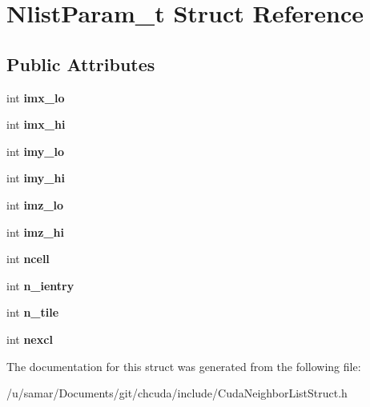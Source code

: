 \hypertarget{structNlistParam__t}{}\section{Nlist\+Param\+\_\+t Struct Reference}
\label{structNlistParam__t}
\subsection*{Public Attributes}
\begin{DoxyCompactItemize}
\item 
\hypertarget{structNlistParam__t_ab78706c9bdb3af53d24fd50f883c1546}{}\label{structNlistParam__t_ab78706c9bdb3af53d24fd50f883c1546} 
int {\bfseries imx\+\_\+lo}
\item 
\hypertarget{structNlistParam__t_a130bf747b9187d966840877eef55b913}{}\label{structNlistParam__t_a130bf747b9187d966840877eef55b913} 
int {\bfseries imx\+\_\+hi}
\item 
\hypertarget{structNlistParam__t_ae36497da13c5d2704f16e0a31fbf0dfd}{}\label{structNlistParam__t_ae36497da13c5d2704f16e0a31fbf0dfd} 
int {\bfseries imy\+\_\+lo}
\item 
\hypertarget{structNlistParam__t_a045160b343cd0a982bdb4e167536f500}{}\label{structNlistParam__t_a045160b343cd0a982bdb4e167536f500} 
int {\bfseries imy\+\_\+hi}
\item 
\hypertarget{structNlistParam__t_a153e766348447e178460a4f6cc36f97d}{}\label{structNlistParam__t_a153e766348447e178460a4f6cc36f97d} 
int {\bfseries imz\+\_\+lo}
\item 
\hypertarget{structNlistParam__t_a111e667909fc5eb69c3b4b9166aba9ed}{}\label{structNlistParam__t_a111e667909fc5eb69c3b4b9166aba9ed} 
int {\bfseries imz\+\_\+hi}
\item 
\hypertarget{structNlistParam__t_a6a6cfb049e7452fcd591c268f038aa49}{}\label{structNlistParam__t_a6a6cfb049e7452fcd591c268f038aa49} 
int {\bfseries ncell}
\item 
\hypertarget{structNlistParam__t_a38820ee7ed32e7238e6672f53f3b152f}{}\label{structNlistParam__t_a38820ee7ed32e7238e6672f53f3b152f} 
int {\bfseries n\+\_\+ientry}
\item 
\hypertarget{structNlistParam__t_a0af748e52cee437bb345cb0d37a1890c}{}\label{structNlistParam__t_a0af748e52cee437bb345cb0d37a1890c} 
int {\bfseries n\+\_\+tile}
\item 
\hypertarget{structNlistParam__t_af8004cb95328ab090b3081132aecc433}{}\label{structNlistParam__t_af8004cb95328ab090b3081132aecc433} 
int {\bfseries nexcl}
\end{DoxyCompactItemize}


The documentation for this struct was generated from the following file\+:\begin{DoxyCompactItemize}
\item 
/u/samar/\+Documents/git/chcuda/include/Cuda\+Neighbor\+List\+Struct.\+h\end{DoxyCompactItemize}
